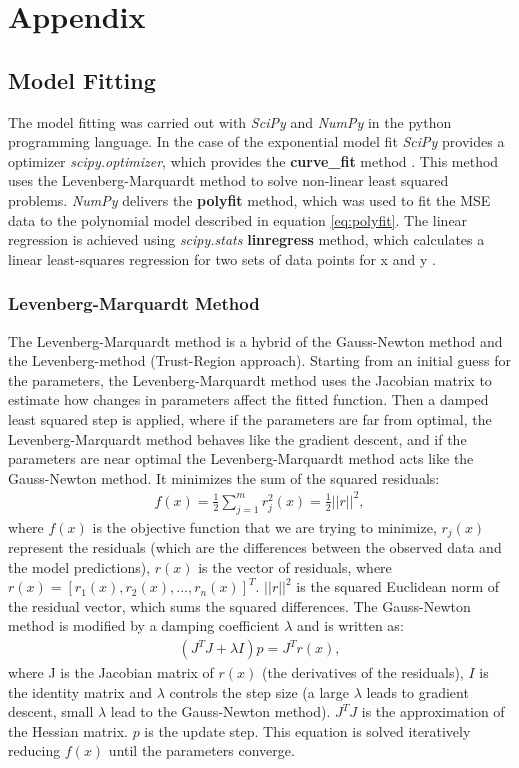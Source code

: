 \chapter{Appendix}\label{chap:appendix}
\section{Model Fitting}\label{sec:modelfitting}
The model fitting was carried out with \textit{SciPy} and \textit{NumPy} in the python programming language. In the case of the exponential model fit \textit{SciPy} provides a optimizer \textit{scipy.optimizer}, which provides the \textbf{curve\_fit} method \cite{SciPyCurveFit}. This method uses the Levenberg-Marquardt method to solve non-linear least squared problems. \textit{NumPy} delivers the \textbf{polyfit} method, which was used to fit the MSE data to the polynomial model described in equation \ref{eq:polyfit}. The linear regression is achieved using \textit{scipy.stats} \textbf{linregress} method, which calculates a linear least-squares regression for two sets of data points for x and y \cite{SciPyLinRegress}.

\subsection{Levenberg-Marquardt Method}\label{subsec:lmMethod}
The Levenberg-Marquardt method is a hybrid of the Gauss-Newton method and the Levenberg-method (Trust-Region approach). Starting from an initial guess for the parameters, the Levenberg-Marquardt method uses the Jacobian matrix to estimate how changes in parameters affect the fitted function. Then a damped least squared step is applied, where if the parameters are far from optimal, the Levenberg-Marquardt method behaves like the gradient descent, and if the parameters are near optimal the Levenberg-Marquardt method acts like the Gauss-Newton method. It minimizes the sum of the squared residuals:
\begin{align}
    f(x)=\frac{1}{2}\sum_{j=1}^{m}{r_{j}^{2}(x)=\frac{1}{2}||r||^{2}},
\end{align}
where $f(x)$ is the objective function that we are trying to minimize, $r_{j}(x)$ represent the residuals (which are the differences between the observed data and the model predictions), $r(x)$ is the vector of residuals, where $r(x)=[r_{1}(x), r_{2}(x),...,r_{n}(x)]^T$. $||r||^{2}$ is the squared Euclidean norm of the residual vector, which sums the squared differences. The Gauss-Newton method is modified by a damping coefficient $\lambda$ and is written as:
\begin{align}
    (J^{T}J+ \lambda I)p = J^{T}r(x),
\end{align}
where J is the Jacobian matrix of $r(x)$ (the derivatives of the residuals), $I$ is the identity matrix and $\lambda$ controls the step size (a large $\lambda$ leads to gradient descent, small $\lambda$ lead to the Gauss-Newton method). $J^{T}J$ is the approximation of the Hessian matrix. $p$ is the update step. This equation is solved iteratively reducing $f(x)$ until the parameters converge.

